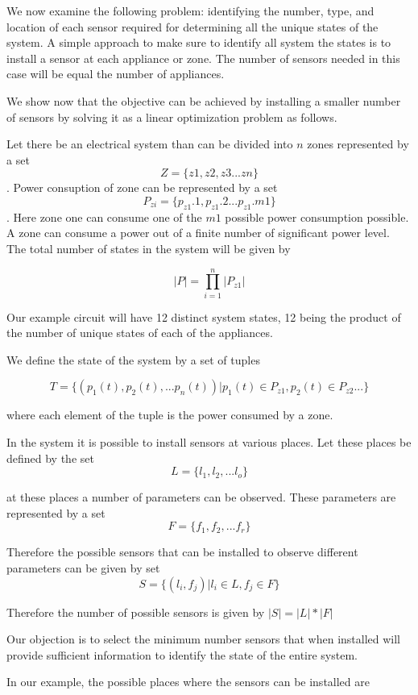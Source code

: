 We now examine the following problem: identifying the number, type, and location of each sensor required for determining all the unique states of the system. A simple approach to make sure to identify all system the states is to install a sensor at each appliance or zone. The number of sensors needed in this case will be equal the number of appliances.

We show now that the objective can be achieved by installing a smaller number of sensors by solving it as a linear optimization problem as follows.

Let there be an electrical system than can be divided into $n$ zones represented by a set $$Z = \{z1, z2, z3 ... zn \}$$. Power consuption of zone can be represented by a set $$P_{zi} = \{p_{z1}.1, p_{z1}.2 ... p_{z1}.m1\}$$. Here zone one can consume one of the $m1$ possible power consumption possible. A zone can consume a power out of a finite number of significant power level. The total number of states in the system will be given by 

\[
|P|  = \prod_{i = 1}^{n} |P_{z1}|  
\]


Our example circuit will have 12 distinct system states, 12 being the product of the number of unique states of each of the appliances.

We define the state of the system by a set of tuples 

$$T = \{(p_1(t), p_2(t),...p_n(t))| p_1(t) \in P_{z1} , p_2(t) \in P_{z2} ... \}$$ 

where each element of the tuple is the power consumed by a zone.

In the system it is possible to install sensors at various places. Let these places be defined by the set $$L = \{l_1, l_2,...l_o\}$$

at these places a number of parameters can be observed. These parameters are represented by a set $$F = \{f_1, f_2,...f_r\}$$

Therefore the possible sensors that can be installed to observe different parameters can be given by set $$S = \{(l_i, f_j)| l_i \in L, f_j \in F\}$$ 

Therefore the number of possible sensors is given by $|S| = |L| * |F|$

Our objection is to select the minimum number sensors that when installed will provide sufficient information to identify the state of the entire system.

In our example, the possible places where the sensors can be installed are 


